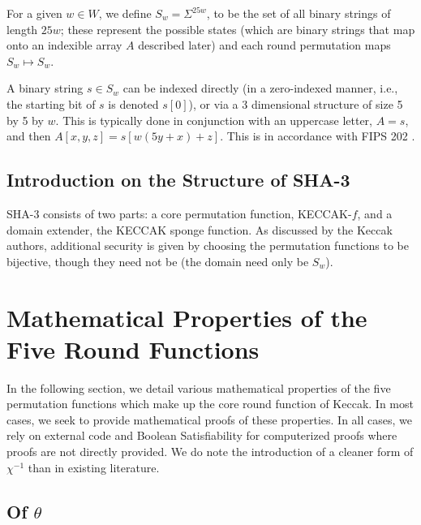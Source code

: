 \documentclass[10pt,twocolumn,twoside]{pnas-new}
\begin{document}
For a given $w \in W$, we define $S_{w} = \Sigma^{25w}$, to be the set of
all binary strings of length $25w$; these represent the possible states (which
are binary strings that map onto an indexible array $A$ described later) and each
round permutation maps $S_{w} \mapsto S_{w}$.

A binary string $s \in S_{w}$ can be indexed directly (in a zero-indexed
manner, i.e., the starting bit of $s$ is denoted $s[0]$), or via a 3
dimensional structure of size 5 by 5 by $w$. This is typically done in
conjunction with an uppercase letter, $A = s$, and then
$A[x, y, z] = s[w(5y + x) + z]$. This is in accordance with
FIPS 202 \cite{NIST202}.

\subsection{Introduction on the Structure of SHA-3} \label{sec:i:structure}

    SHA-3 consists of two parts: a core permutation function, KECCAK-$f$, and
a domain extender, the KECCAK sponge function. As discussed by the Keccak
authors, additional security is given by choosing the permutation functions to
be bijective, though they need not be (the domain need only be $S_{w}$).







\section{Mathematical Properties of the Five Round Functions} \label{sec:properties}

In the following section, we detail various mathematical properties of the five
permutation functions which make up the core round function of Keccak. In most
cases, we seek to provide mathematical proofs of these properties. In all
cases, we rely on external code and Boolean Satisfiability for computerized
proofs where proofs are not directly provided. We do note the introduction of
a cleaner form of $\chi^{-1}$ than in existing literature.


\subsection{Of $\theta$} \label{sec:p:t}
\end{document}
